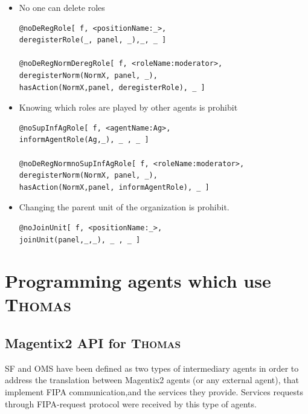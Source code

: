 \begin{enumerate}
\begin{itemize}
\begin{itemize}
\item No one can delete roles
\begin{verbatim}
@noDeRegRole[ f, <positionName:_>, 
deregisterRole(_, panel, _),_, _ ] 

@noDeRegNormDeregRole[ f, <roleName:moderator>, 
deregisterNorm(NormX, panel, _),
hasAction(NormX,panel, deregisterRole), _ ] 
\end{verbatim}

\item Knowing which roles are played by other agents is prohibit
\begin{verbatim}
@noSupInfAgRole[ f, <agentName:Ag>,
informAgentRole(Ag,_), _ , _ ] 

@noDeRegNormnoSupInfAgRole[ f, <roleName:moderator>,
deregisterNorm(NormX, panel, _),
hasAction(NormX,panel, informAgentRole), _ ] 

\end{verbatim}

\item Changing the parent unit of the organization is prohibit.   
\begin{verbatim}
@noJoinUnit[ f, <positionName:_>, 
joinUnit(panel,_,_), _ , _ ] 
\end{verbatim}

\end{itemize}


\end{itemize}












\end{enumerate}




\section{Programming agents which use \textsc{Thomas}}\label{sec:programmingAgentsThomas}

\subsection{Magentix2 API for \textsc{Thomas}}\label{thomasAPI}
SF and OMS have been defined as two types of intermediary agents in order to address the translation between Magentix2 agents (or any external agent), that implement FIPA communication,and the services they provide. Services requests through FIPA-request protocol were received by this type of agents.

